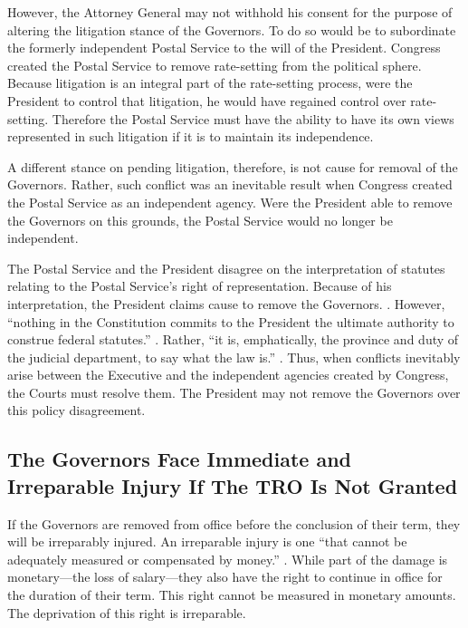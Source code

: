 \documentclass[12pt,\documentclassflag]{complaint}
\begin{document}
However, the Attorney General may not withhold his consent for the purpose of altering the litigation stance of the Governors.  To do so would be to subordinate the formerly independent Postal Service to the will of the President.  Congress created the Postal Service to remove rate-setting from the political sphere.  Because litigation is an integral part of the rate-setting process, were the President to control that litigation, he would have regained control over rate-setting.  Therefore the Postal Service must have the ability to have its own views represented in such litigation if it is to maintain its independence.

A different stance on pending litigation, therefore, is not cause for removal of the Governors.  Rather, such conflict was an inevitable result when Congress created the Postal Service as an independent agency.  Were the President able to remove the Governors on this grounds, the Postal Service would no longer be independent. 

The Postal Service and the President disagree on the interpretation of statutes relating to the Postal Service's right of representation.  Because of his interpretation, the President claims cause to remove the Governors.  \See {}. However, ``nothing in the Constitution commits to the President the ultimate authority to construe federal statutes.'' .  Rather, ``it is, emphatically, the province and duty of the judicial department, to say what the law is.'' .  Thus, when conflicts inevitably arise between the Executive and the independent agencies created by Congress, the Courts must resolve them.   The President may not remove the Governors over this policy disagreement.

\subsection{The Governors Face Immediate and Irreparable Injury If The TRO Is Not Granted}

If the Governors are removed from office before the conclusion of their term, they will be irreparably injured.  An irreparable injury is one ``that cannot be adequately measured or compensated by money.'' \cite{Black's Law Dictionary}.  While part of the damage is monetary---the loss of salary---they also have the right to continue in office for the duration of their term.  This right cannot be measured in monetary amounts. The deprivation of this right is irreparable.
\end{document}
